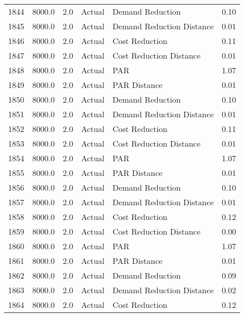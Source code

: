 \begin{longtable}{lrrllr}
1844 &       8000.0 &     2.0 &         Actual &           Demand Reduction &   0.10 \\
1845 &       8000.0 &     2.0 &         Actual &  Demand Reduction Distance &   0.01 \\
1846 &       8000.0 &     2.0 &         Actual &             Cost Reduction &   0.11 \\
1847 &       8000.0 &     2.0 &         Actual &    Cost Reduction Distance &   0.01 \\
1848 &       8000.0 &     2.0 &         Actual &                        PAR &   1.07 \\
1849 &       8000.0 &     2.0 &         Actual &               PAR Distance &   0.01 \\
1850 &       8000.0 &     2.0 &         Actual &           Demand Reduction &   0.10 \\
1851 &       8000.0 &     2.0 &         Actual &  Demand Reduction Distance &   0.01 \\
1852 &       8000.0 &     2.0 &         Actual &             Cost Reduction &   0.11 \\
1853 &       8000.0 &     2.0 &         Actual &    Cost Reduction Distance &   0.01 \\
1854 &       8000.0 &     2.0 &         Actual &                        PAR &   1.07 \\
1855 &       8000.0 &     2.0 &         Actual &               PAR Distance &   0.01 \\
1856 &       8000.0 &     2.0 &         Actual &           Demand Reduction &   0.10 \\
1857 &       8000.0 &     2.0 &         Actual &  Demand Reduction Distance &   0.01 \\
1858 &       8000.0 &     2.0 &         Actual &             Cost Reduction &   0.12 \\
1859 &       8000.0 &     2.0 &         Actual &    Cost Reduction Distance &   0.00 \\
1860 &       8000.0 &     2.0 &         Actual &                        PAR &   1.07 \\
1861 &       8000.0 &     2.0 &         Actual &               PAR Distance &   0.01 \\
1862 &       8000.0 &     2.0 &         Actual &           Demand Reduction &   0.09 \\
1863 &       8000.0 &     2.0 &         Actual &  Demand Reduction Distance &   0.02 \\
1864 &       8000.0 &     2.0 &         Actual &             Cost Reduction &   0.12 \\

\end{longtable}
